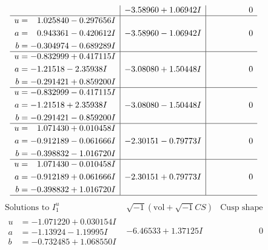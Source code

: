 \documentclass[1p]{elsarticle_modified}
\theoremstyle{definition}
\newcommand{\I}{\sqrt{-1}}
\begin{document}
$$\begin{array}{c|c|c}
 & -3.58960 + 1.06942 I & \phantom{-0.000000 } 0 \\ \hline\begin{aligned}
u &= \phantom{-}1.025840 - 0.297656 I \\
a &= \phantom{-}0.943361 - 0.420612 I \\
b &= -0.304974 - 0.689289 I\end{aligned}
 & -3.58960 - 1.06942 I & \phantom{-0.000000 } 0 \\ \hline\begin{aligned}
u &= -0.832999 + 0.417115 I \\
a &= -1.21518 - 2.35938 I \\
b &= -0.291421 + 0.859200 I\end{aligned}
 & -3.08080 + 1.50448 I & \phantom{-0.000000 } 0 \\ \hline\begin{aligned}
u &= -0.832999 - 0.417115 I \\
a &= -1.21518 + 2.35938 I \\
b &= -0.291421 - 0.859200 I\end{aligned}
 & -3.08080 - 1.50448 I & \phantom{-0.000000 } 0 \\ \hline\begin{aligned}
u &= \phantom{-}1.071430 + 0.010458 I \\
a &= -0.912189 - 0.061666 I \\
b &= -0.398832 - 1.016720 I\end{aligned}
 & -2.30151 - 0.79773 I & \phantom{-0.000000 } 0 \\ \hline\begin{aligned}
u &= \phantom{-}1.071430 - 0.010458 I \\
a &= -0.912189 + 0.061666 I \\
b &= -0.398832 + 1.016720 I\end{aligned}
 & -2.30151 + 0.79773 I & \phantom{-0.000000 } 0\\
 \hline 
 \end{array}$$\newpage$$\begin{array}{c|c|c}  
\text{Solutions to }I^u_{1}& \I (\text{vol} + \sqrt{-1}CS) & \text{Cusp shape}\\
 \hline 
\begin{aligned}
u &= -1.071220 + 0.030154 I \\
a &= -1.13924 - 1.19995 I \\
b &= -0.732485 + 1.068550 I\end{aligned}
 & -6.46533 + 1.37125 I & \phantom{-0.000000 } 0 \\ \hline\begin{aligned}

\end{aligned}
\end{array}$$
\end{document}
